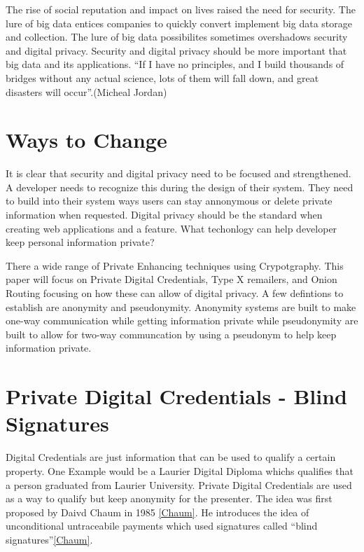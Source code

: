 \documentclass[12pt]{article}
\begin{document}
The rise of social reputation and impact on lives raised the need for security. The lure of big data entices companies to quickly convert implement big data storage and collection. The lure of big data possibilites sometimes overshadows security and digital privacy. Security and digital privacy should be more important that big data and its applications. ``If I have no principles, and I build thousands of bridges without any actual science, lots of them will fall down, and great disasters will occur''.(Micheal Jordan)\cite{Gomes}

\section{Ways to  Change}\label{sec:developers}
It is clear that security and digital privacy need to be focused and strengthened. A developer needs to recognize this during the design of their system. They need to build into their system ways users can stay annonymous or delete private information when requested. Digital privacy should be the standard when creating web applications and a feature. What techonlogy can help developer keep personal information private?

There a wide range of Private Enhancing techniques using Crypotgraphy. This paper will focus on Private Digital Credentials, Type X remailers, and Onion Routing focusing on how these can allow of digital privacy. A few defintions to establish are anonymity and pseudonymity. Anonymity systems are built to make one-way communication while getting information private while pseudonymity are built to allow for two-way communcation by using a pseudonym to help keep information private. \cite{GoldbergTwo}

\section{Private Digital Credentials - Blind Signatures}\label{sec:PDC}
Digital Credentials are just information that can be used to qualify a certain property. One Example would be a Laurier Digital Diploma whichs qualifies that a person graduated from Laurier University.  Private Digital Credentials are used as a way to qualify but keep anonymity for the presenter. The idea was first proposed by Daivd Chaum in 1985 \ref{Chaum}. He introduces the idea of unconditional untraceabile payments which used signatures called ``blind signatures''\ref{Chaum}. 
\end{document}
